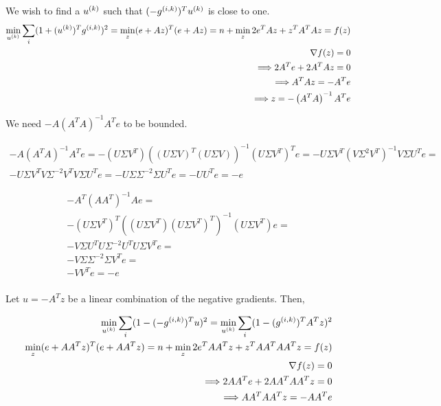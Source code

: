 We wish to find a ${u^{(k)}}$ such that $(-{g^{(i, k)}})^T{u^{(k)}}$ is close to one.
\begin{align*}
\min_{{u^{(k)}}} \sum_i (1 + ({u^{(k)}})^T{g^{(i, k)}})^2 = \min_z (e + Az)^T(e + Az) = n + \min_z 2e^TAz + z^T A^TA z = f(z) \\
\nabla f(z) = 0 \\
\Longrightarrow 2 A^Te+2A^TAz = 0 \\
\Longrightarrow A^TAz = -A^Te \\
\Longrightarrow z = -\left(A^TA\right)^{-1} A^Te \\
\end{align*}

We need $-A(A^TA)^{-1}A^Te$ to be bounded.


\begin{align*}
-A(A^TA)^{-1}A^Te = 
-(U\Sigma V^T)((U\Sigma V)^T(U\Sigma V))^{-1}(U\Sigma V^T)^Te = 
-U\Sigma V^T(V\Sigma^2 V^T)^{-1}V\Sigma U^Te = \\
-U\Sigma V^TV\Sigma^{-2} V^TV\Sigma U^Te =
-U\Sigma \Sigma^{-2} \Sigma U^Te =
-U U^Te = -e
\end{align*}


\begin{align*}
-A^T(AA^T)^{-1}Ae = \\
-(U\Sigma V^T)^T((U\Sigma V^T)(U\Sigma V^T)^T)^{-1}(U\Sigma V^T)e = \\
-V\Sigma U^TU\Sigma^{-2} U^TU\Sigma V^Te = \\
-V\Sigma \Sigma^{-2} \Sigma V^Te = \\
-V V^Te = -e\\
\end{align*}





Let $u = -A^Tz$ be a linear combination of the negative gradients.
Then, 

\begin{align*}
\min_{{u^{(k)}}} \sum_i (1 - (-{g^{(i, k)}})^Tu)^2 = \min_{{u^{(k)}}} \sum_i (1 - ({g^{(i, k)}})^TA^Tz)^2 \\
\min_z (e + AA^Tz)^T(e + AA^Tz) = n + \min_z 2e^TAA^Tz + z^T AA^TAA^T z = f(z) \\
\nabla f(z) = 0 \\
\Longrightarrow 2 AA^Te+2AA^TAA^Tz = 0 \\
\Longrightarrow AA^TAA^Tz = -AA^Te \\
\end{align*}




